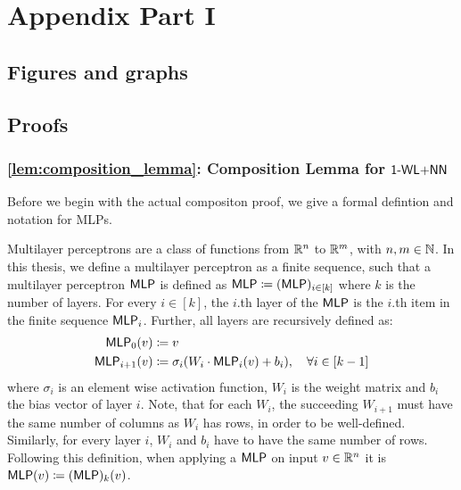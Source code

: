 \newpage
\appendix
\chapter{Appendix Part I}
\section{Figures and graphs}


\section{Proofs}

\subsection{\cref{lem:composition_lemma}: Composition Lemma for $\textsf{1-WL+NN}$}\label{app:composition_proof}
Before we begin with the actual compositon proof, we give a formal defintion and notation for MLPs.

\begin{definition}\label{def:mlp}
    Multilayer perceptrons are a class of functions from $\mathbb{R}^n$ to $\mathbb{R}^m$, with $n,m \in \mathbb{N}$. In this thesis, we define a multilayer perceptron as a finite sequence, such that a multilayer perceptron $\textsf{MLP}$ is defined as $\textsf{MLP} \coloneqq (\textsf{MLP})_{i\in[k]}$ where $k$ is the number of layers. For every $i \in [k]$, the $i$.th layer of the $\textsf{MLP}$ is the $i$.th item in the finite sequence $\textsf{MLP}_i$. Further, all layers are recursively defined as: 
    \begin{align*}
        \textsf{MLP}_{0}(v) &\coloneqq v\\
        \textsf{MLP}_{i+1}(v) &\coloneqq \sigma_i(W_i \cdot \textsf{MLP}_{i} (v) + b_i), \quad \forall i \in [k-1]
    \end{align*}
    where $\sigma_i$ is an element wise activation function, $W_i$ is the weight matrix and $b_i$ the bias vector of layer $i$. Note, that for each $W_i$, the succeeding $W_{i+1}$ must have the same number of columns as $W_i$ has rows, in order to be well-defined. Similarly, for every layer $i$, $W_i$ and $b_i$ have to have the same number of rows.
    Following this definition, when applying a $\textsf{MLP}$ on input $v \in \mathbb{R}^n$ it is $\textsf{MLP}(v) \coloneqq (\textsf{MLP})_k(v)$.
\end{definition}

